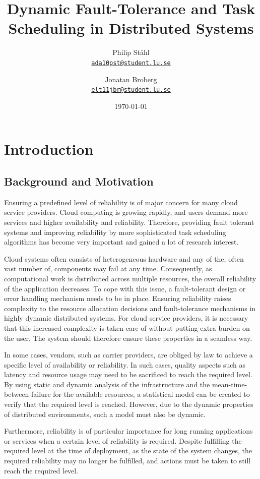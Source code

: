 \documentclass{cslthse-msc}
\author{
	Philip Ståhl \\
	{\normalsize \href{mailto:ada10pst@student.lu.se}{\texttt{ada10pst@student.lu.se}}}
	\and
	Jonatan Broberg \\
    {\normalsize \href{mailto:elt11jbr@student.lu.se}{\texttt{elt11jbr@student.lu.se}}}
}
\title{Dynamic Fault-Tolerance and Task Scheduling in Distributed Systems}
\subtitle{}
\date{\today}
\begin{document}
\makefrontmatter

\chapter{Introduction} \label{ch:introduction} 
\section{Background and Motivation} \label{sec:introduction_backgroud_motivation}
Ensuring a predefined level of reliability is of major concern for many cloud service providers. Cloud computing is growing rapidly, and users demand more services and higher availability and reliability. Therefore, providing fault tolerant systems and improving reliability by more sophisticated task scheduling algorithms has become very important and gained a lot of research interest.

Cloud systems often consists of heterogeneous hardware and any of the, often vast number of, components may fail at any time. Consequently, as computational work is distributed across multiple resources, the overall reliability of the application decreases. To cope with this issue, a fault-tolerant design or error handling mechanism needs to be in place. Ensuring reliability raises complexity to the resource allocation decisions and fault-tolerance mechanisms in highly dynamic distributed systems. For cloud service providers, it is necessary that this increased complexity is taken care of without putting extra burden on the user. The system should therefore ensure these properties in a seamless way.

In some cases, vendors, such as carrier providers, are obliged by law to achieve a specific level of availability or reliability. In such cases, quality aspects such as latency and resource usage may need to be sacrificed to reach the required level. By using static and dynamic analysis of the infrastructure and the mean-time-between-failure for the available resources, a statistical model can be created to verify that the required level is reached. However, due to the dynamic properties of distributed environments, such a model must also be dynamic. 

Furthermore, reliability is of particular importance for long running applications or services when a certain level of reliability is required. Despite fulfilling the required level at the time of deployment, as the state of the system changes, the required reliability may no longer be fulfilled, and actions must be taken to still reach the required level.
\end{document}
